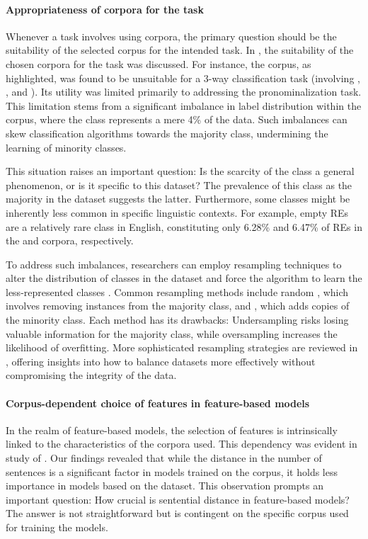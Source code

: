 \paragraph*{Appropriateness of corpora for the task}

Whenever a task involves using corpora, the primary question should be the suitability of the selected corpus for the intended task. In , the suitability of the chosen corpora for the \context task was discussed. For instance, the \grecp corpus, as highlighted, was found to be unsuitable for a 3-way classification task (involving , , and ). Its utility was limited primarily to addressing the pronominalization task. This limitation stems from a significant imbalance in label distribution within the \grecp corpus, where the  class represents a mere 4\% of the data. Such imbalances can skew classification algorithms towards the majority class, undermining the learning of minority classes.

This situation raises an important question: Is the scarcity of the  class a general phenomenon, or is it specific to this dataset? The prevalence of this class as the majority in the \wsj dataset suggests the latter. Furthermore, some classes might be inherently less common in specific linguistic contexts. For example, empty REs are a relatively rare class in English, constituting only 6.28\% and 6.47\% of REs in the \grectwo and \grecp corpora, respectively.

To address such imbalances, researchers can employ resampling techniques to alter the distribution of classes in the dataset and force the algorithm to learn the less-represented classes \citep{weiss2003learning,Mountassir2012,Branco2016,padurariu2019dealing}. Common resampling methods include random , which involves removing instances from the majority class, and , which adds copies of the minority class. Each method has its drawbacks: Undersampling risks losing valuable information for the majority class, while oversampling increases the likelihood of overfitting. More sophisticated resampling strategies are reviewed in \citet{Branco2016}, offering insights into how to balance datasets more effectively without compromising the integrity of the data.


\paragraph*{Corpus-dependent choice of features in feature-based models}  
In the realm of feature-based \context models, the selection of features is intrinsically linked to the characteristics of the corpora used. This dependency was evident in study \studC of . Our findings revealed that while the distance in the number of sentences is a significant factor in models trained on the \wsj corpus, it holds less importance in models based on the \grectwo dataset. This observation prompts an important question: How crucial is sentential distance in feature-based models? The answer is not straightforward but is contingent on the specific corpus used for training the models.

